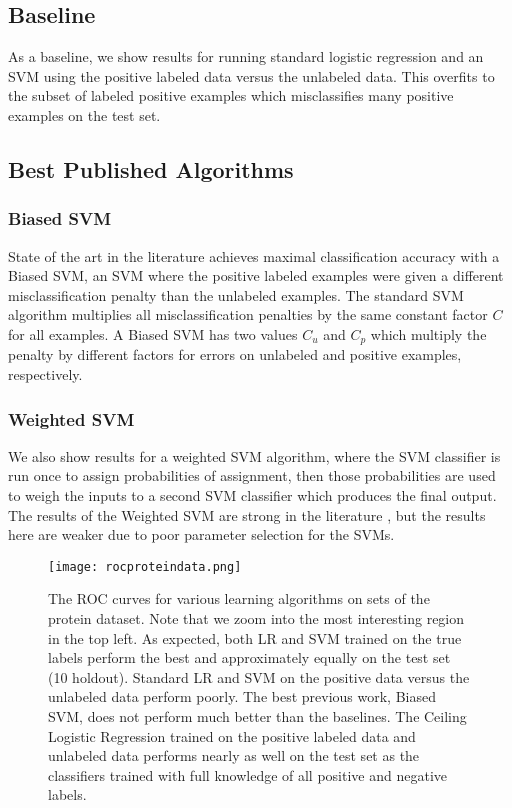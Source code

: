 \documentclass{article}
\begin{document}
\subsection{Baseline}

As a baseline, we show results for running standard logistic regression and an SVM using the positive labeled data versus the unlabeled data.  This overfits to the subset of labeled positive examples which misclassifies many positive examples on the test set.

\subsection{Best Published Algorithms}

\subsubsection{Biased SVM}

State of the art in the literature \cite{elkan08} achieves maximal classification accuracy with a Biased SVM, an SVM where the positive labeled examples were given a different misclassification penalty than the unlabeled examples.  The standard SVM algorithm multiplies all misclassification penalties by the same constant factor $C$ for all examples. A Biased SVM has two values $C_u$ and $C_p$ which multiply the penalty by different factors for errors on unlabeled and positive examples, respectively.

\subsubsection{Weighted SVM}

We also show results for a weighted SVM algorithm, where the SVM classifier is run once to assign probabilities of assignment, then those probabilities are used to weigh the inputs to a second SVM classifier which produces the final output.  The results of the Weighted SVM are strong in the literature \cite{elkan08}, but the results here are weaker due to poor parameter selection for the SVMs.

\begin{figure*}[ht!]
\vskip 0.2in
\begin{center}
\centerline{\texttt{[image: rocproteindata.png]}}
\caption{The ROC curves for various learning algorithms on sets of the protein dataset.  Note that we zoom into the most interesting region in the top left.  As expected, both LR and SVM trained on the true labels perform the best and approximately equally on the test set (10 holdout). Standard LR and SVM on the positive data versus the unlabeled data perform poorly.  The best previous work, Biased SVM, does not perform much better than the baselines.  The Ceiling Logistic Regression trained on the positive labeled data and unlabeled data performs nearly as well on the test set as the classifiers trained with full knowledge of all positive and negative labels.}
\label{roc}
\end{center}
\vskip -0.2in
\end{figure*}
\end{document}
